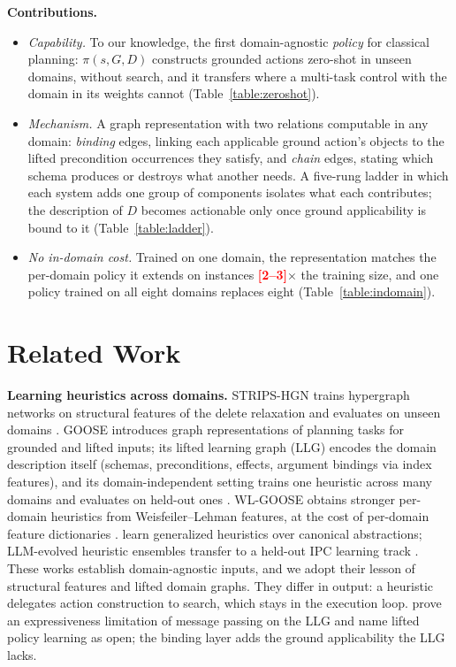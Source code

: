 \documentclass[letterpaper]{article} %
\newcommand{\todonum}[1]{\textcolor{red}{\textbf{[#1]}}}
\begin{document}
\textbf{Contributions.}
\begin{itemize}
\item \emph{Capability.} To our knowledge, the first domain-agnostic
  \emph{policy} for classical planning: $\pi(s, G, D)$ constructs grounded
  actions zero-shot in unseen domains, without search, and it transfers
  where a multi-task control with the domain in its weights cannot
  (Table~\ref{table:zeroshot}).
\item \emph{Mechanism.} A graph representation with two relations
  computable in any domain: \emph{binding} edges, linking each applicable
  ground action's objects to the lifted precondition occurrences they
  satisfy, and \emph{chain} edges, stating which schema produces or
  destroys what another needs. A five-rung ladder in which each system adds
  one group of components isolates what each contributes; the description of
  $D$ becomes actionable only once ground applicability is bound to it
  (Table~\ref{table:ladder}).
\item \emph{No in-domain cost.} Trained on one domain, the representation
  matches the per-domain policy it extends on instances
  \todonum{2--3}$\times$ the training size, and one policy trained on all
  eight domains replaces eight (Table~\ref{table:indomain}).
\end{itemize}

\section{Related Work}

\textbf{Learning heuristics across domains.} STRIPS-HGN trains hypergraph
networks on structural features of the delete relaxation and evaluates on
unseen domains \citep{strips_hgn}. GOOSE introduces graph representations of
planning tasks for grounded and lifted inputs; its lifted learning graph
(LLG) encodes the domain description itself (schemas, preconditions,
effects, argument bindings via index features), and its domain-independent
setting trains one heuristic across many domains and evaluates on held-out
ones \citep{goose_v1, goose_v2}. WL-GOOSE obtains stronger per-domain
heuristics from Weisfeiler--Lehman features, at the cost of per-domain
feature dictionaries \citep{wl_goose}. \citet{karia2021learning} learn
generalized heuristics over canonical abstractions; LLM-evolved heuristic
ensembles transfer to a held-out IPC learning track
\citep{llm_evolved_heuristics_2026}. These works establish domain-agnostic
inputs, and we adopt their lesson of structural features and lifted domain
graphs. They differ in output: a heuristic delegates action construction to
search, which stays in the execution loop. \citet{goose_v2} prove an
expressiveness limitation of message passing on the LLG and name lifted
policy learning as open; the binding layer adds the ground applicability
the LLG lacks.
\end{document}
